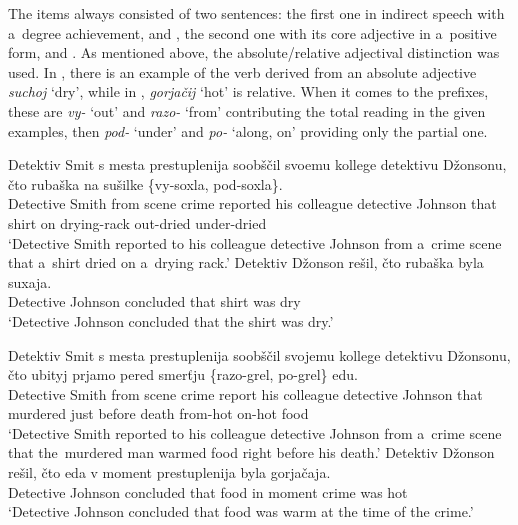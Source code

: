 \documentclass[output=paper]{langscibook}
\begin{document}
The items always consisted of two sentences: the first one in indirect speech with a~degree achievement,  and , the second one with its core adjective in a~positive form,  and . As mentioned above, the absolute/relative adjectival distinction was used. In , there is an example of the verb derived from an absolute adjective \textit{suchoj} `dry', while in , \textit{gorjačij} `hot' is relative. %
When it comes to the prefixes, these are \textit{vy-} `out' and \textit{razo-} `from' contributing the total reading in the given examples, then \textit{pod-} `under' and \textit{po-} `along, on' providing only the partial one. 


\ea\label{DA:ex:item1} 
\ea\label{DA:ex:item1a} 
\gll Detektiv Smit s mesta prestuplenija soobščil svoemu kollege detektivu Džonsonu, čto rubaška na sušilke \{vy-soxla, pod-soxla\}. \\ 
Detective Smith from scene crime reported his colleague detective Johnson that shirt on drying-rack out-dried  under-dried {} \\
\glt `Detective Smith reported to his colleague detective Johnson from a~crime scene that a~shirt dried on a~drying rack.'
\ex\label{DA:ex:item1b} \gll Detektiv Džonson rešil, čto rubaška byla suxaja. \\
Detective Johnson concluded that shirt was dry \\
\glt `Detective Johnson concluded that the shirt was dry.'
\z \z

\ea\label{DA:ex:item2}
\ea\label{DA:ex:item2a}\gll Detektiv Smit s mesta prestuplenija soobščil svojemu kollege detektivu Džonsonu, čto ubityj prjamo pered smerťju \{razo-grel, po-grel\} edu. \\
Detective Smith from scene crime report his colleague detective Johnson that murdered just before death from-hot on-hot food \\
\glt `Detective Smith reported to his colleague detective Johnson from a~crime scene that the~murdered man warmed food right before his death.'
\ex\label{DA:ex:item2b} \gll Detektiv Džonson rešil, čto eda v moment prestuplenija byla gorjačaja. \\
Detective Johnson concluded that food in moment crime was hot \\
\glt `Detective Johnson concluded that food was warm at the time of the crime.'
\z \z
\end{document}
